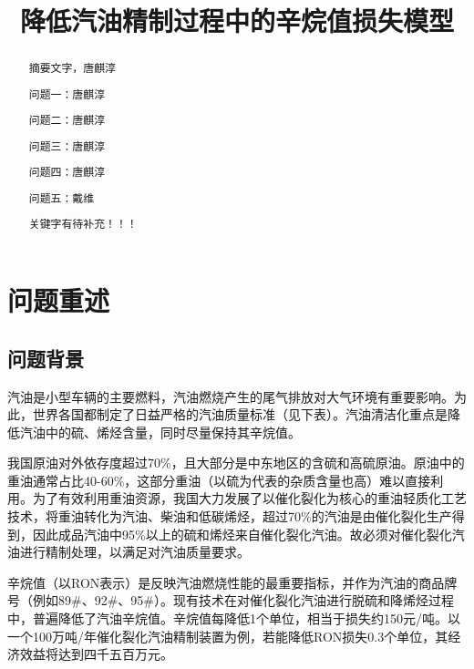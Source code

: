 \documentclass[bwprint]{gmcmthesis}
\title{降低汽油精制过程中的辛烷值损失模型}
\begin{document}
 \maketitle


\begin{abstract}
摘要文字，唐麒淳


问题一：唐麒淳

问题二：唐麒淳

问题三：唐麒淳

问题四：唐麒淳

问题五：戴维


关键字有待补充！！！
\end{abstract}



\pagestyle{plain}


 \tableofcontents

\newpage


\FloatBarrier
\section{问题重述}
\FloatBarrier
\subsection{问题背景}

汽油是小型车辆的主要燃料，汽油燃烧产生的尾气排放对大气环境有重要影响。为此，世界各国都制定了日益严格的汽油质量标准（见下表）。汽油清洁化重点是降低汽油中的硫、烯烃含量，同时尽量保持其辛烷值。

我国原油对外依存度超过70\%，且大部分是中东地区的含硫和高硫原油。原油中的重油通常占比40-60\%，这部分重油（以硫为代表的杂质含量也高）难以直接利用。为了有效利用重油资源，我国大力发展了以催化裂化为核心的重油轻质化工艺技术，将重油转化为汽油、柴油和低碳烯烃，超过70\%的汽油是由催化裂化生产得到，因此成品汽油中95\%以上的硫和烯烃来自催化裂化汽油。故必须对催化裂化汽油进行精制处理，以满足对汽油质量要求。

辛烷值（以RON表示）是反映汽油燃烧性能的最重要指标，并作为汽油的商品牌号（例如89\#、92\#、95\#）。现有技术在对催化裂化汽油进行脱硫和降烯烃过程中，普遍降低了汽油辛烷值。辛烷值每降低1个单位，相当于损失约150元/吨。以一个100万吨/年催化裂化汽油精制装置为例，若能降低RON损失0.3个单位，其经济效益将达到四千五百万元。
\end{document}
